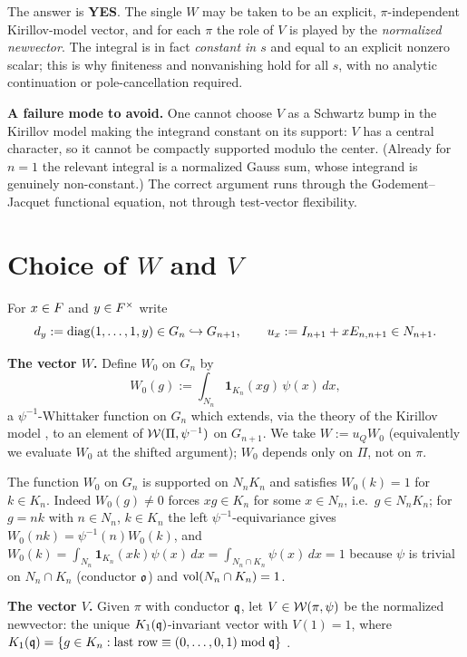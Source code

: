 \medskip
\noindent The answer is \textbf{YES}. The single $W$ may be taken to be an
explicit, $\pi$-independent Kirillov-model vector, and for each $\pi$
the role of $V$ is played by the \emph{normalized newvector}. The integral is in
fact \emph{constant in $s$} and equal to an explicit nonzero scalar; this is why
finiteness and nonvanishing hold for all $s$, with no analytic continuation or
pole-cancellation required.

\medskip
\noindent\textbf{A failure mode to avoid.} One cannot choose $V$ as a
Schwartz bump in the Kirillov model making the integrand constant on its
support: $V$ has a central character, so it cannot be compactly supported modulo
the center. (Already for $n=1$ the relevant integral is a normalized Gauss sum,
whose integrand is genuinely non-constant.) The correct argument runs through the
Godement--Jacquet functional equation, not through test-vector flexibility.

\section*{Choice of $W$ and $V$}

For $x\in F$ and $y\in F^\times$ write
\[
d_y:=\operatorname{diag}(1,\dots,1,y)\in G_n\hookrightarrow G_{n+1},\qquad
u_x:=I_{n+1}+xE_{n,n+1}\in N_{n+1}.
\]

\noindent\textbf{The vector $W$.} Define $W_0$ on $G_n$ by
\begin{equation}\label{eq:W0}
W_0(g):=\int_{N_n}\mathbf 1_{K_n}(xg)\,\psi(x)\,dx,
\end{equation}
a $\psi^{-1}$-Whittaker function on $G_n$ which extends, via the theory of the
Kirillov model \cite{Bernstein}, to an element of $\mathcal{W}(\Pi,\psi^{-1})$ on
$G_{n+1}$. We take $W:=u_Q W_0$ (equivalently we evaluate $W_0$ at the shifted
argument); $W_0$ depends only on $\Pi$, not on $\pi$.

The function $W_0$ on $G_n$ is supported on $N_nK_n$ and satisfies $W_0(k)=1$ for
$k\in K_n$. Indeed $W_0(g)\neq0$ forces $xg\in K_n$ for some $x\in N_n$, i.e.\
$g\in N_nK_n$; for $g=nk$ with $n\in N_n$, $k\in K_n$ the left $\psi^{-1}$-equivariance
gives $W_0(nk)=\psi^{-1}(n)W_0(k)$, and $W_0(k)=\int_{N_n}\mathbf 1_{K_n}(xk)\psi(x)\,dx
=\int_{N_n\cap K_n}\psi(x)\,dx=1$ because $\psi$ is trivial on $N_n\cap K_n$ (conductor
$\mathfrak{o}$) and $\operatorname{vol}(N_n\cap K_n)=1$.

\noindent\textbf{The vector $V$.} Given $\pi$ with conductor $\mathfrak{q}$, let
$V\in\mathcal{W}(\pi,\psi)$ be the normalized newvector: the unique $K_1(\mathfrak{q})$-invariant
vector with $V(1)=1$, where
$K_1(\mathfrak{q})=\{g\in K_n:\text{last row}\equiv(0,\dots,0,1)\bmod\mathfrak{q}\}$
\cite{JPSS81,Matringe}.


